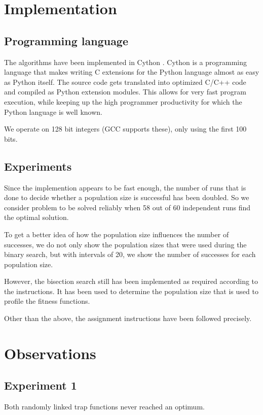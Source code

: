 \documentclass[12pt]{article}
\theoremstyle{definition}
\begin{document}
\maketitle

\section{Implementation}

\subsection*{Programming language}
The algorithms have been implemented in Cython \cite{cython}.
Cython is a programming language that makes writing C extensions for the Python language almost as easy as Python itself.
The source code gets translated into optimized C/C++ code and compiled as Python extension modules.
This allows for very fast program execution, while keeping up the high programmer productivity for which the Python language is well known.

We operate on 128 bit integers (GCC supports these), only using the first 100 bits.

\subsection*{Experiments}
Since the implemention appears to be fast enough, the number of runs that is done to decide whether a population size is successful has been doubled.
So we consider problem to be solved reliably when 58 out of 60 independent runs find the optimal solution.

To get a better idea of how the population size influences the number of successes, we do not only show the population sizes that were used during the binary search, but with intervals of 20, we show the number of successes for each population size.

However, the bisection search still has been implemented as required according to the instructions.
It has been used to determine the population size that is used to profile the fitness functions.

Other than the above, the assignment instructions have been followed precisely.


\section{Observations}

\subsection*{Experiment 1}
Both randomly linked trap functions never reached an optimum.
\end{document}
